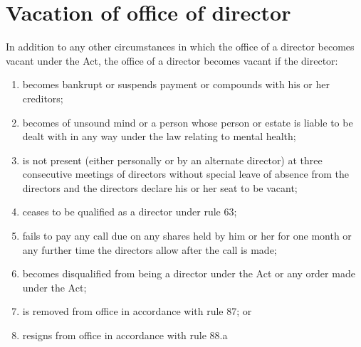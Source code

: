 \section{Vacation of office of director}

In addition to any other circumstances in which the office of a director becomes vacant under the Act, the office of a director becomes vacant if the director:

\begin{enumerate}[label=(\alph*)]
    \item becomes bankrupt or suspends payment or compounds with his or her creditors;
    
    \item becomes of unsound mind or a person whose person or estate is liable to be dealt with in any way under the law relating to mental health;
    
    \item is not present (either personally or by an alternate director) at three consecutive meetings of directors without special leave of absence from the directors and the directors declare his or her seat to be vacant;
    
    \item ceases to be qualified as a director under rule 63;
    
    \item fails to pay any call due on any shares held by him or her for one month or any further time the directors allow after the call is made;
    
    \item becomes disqualified from being a director under the Act or any order made under the Act;
    
    \item is removed from office in accordance with rule 87; or
    
    \item resigns from office in accordance with rule 88.a
\end{enumerate} 